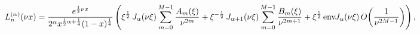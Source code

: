 \[\mathop{L^{(\alpha)}_{n}\/}\nolimits\!\left(\nu x\right)=\frac{e^{\frac{1}{2}%
\nu x}}{2^{\alpha}x^{\frac{1}{2}\alpha+\frac{1}{4}}(1-x)^{\frac{1}{4}}}\left(%
\xi^{\frac{1}{2}}\mathop{J_{\alpha}\/}\nolimits\!\left(\nu\xi\right)\sum_{m=0}%
^{M-1}\frac{A_{m}(\xi)}{\nu^{2m}}+\xi^{-\frac{1}{2}}\mathop{J_{\alpha+1}\/}%
\nolimits\!\left(\nu\xi\right)\sum_{m=0}^{M-1}\frac{B_{m}(\xi)}{\nu^{2m+1}}+%
\xi^{\frac{1}{2}}\mathop{\mathrm{env}\mskip-2.0mu J_{\alpha}\/}\nolimits\!%
\left(\nu\xi\right)\mathop{O\/}\nolimits\!\left(\frac{1}{\nu^{2M-1}}\right)%
\right),\]